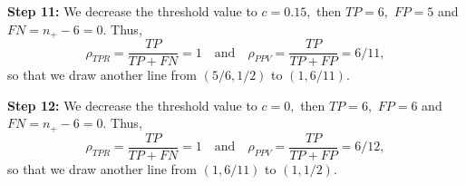 \documentclass[a4paper]{article}
\begin{document}
{\begin{minipage}{0.5\textwidth}
	\textbf{Step 11:}
We decrease the threshold value to $c=0.15,$ then $TP=6,$ $FP=5$ and $FN= n_+ - 6 = 0.$
%
Thus, 
%
%
$$  \rho_{TPR} = \frac{TP}{TP+FN} =  1 \quad \mbox{and} \quad \rho_{PPV} = \frac{TP}{TP + FP} =  6/11, $$
%
so that we draw another line from $(5/6,1/2)$ to $(1,6/11).$
%
\end{minipage}
\begin{minipage}{0.45\textwidth}
\centering
{}
\end{minipage}

\begin{minipage}{0.5\textwidth}
	\textbf{Step 12:}
We decrease the threshold value to $c=0,$ then $TP=6,$ $FP=6$ and $FN= n_+ - 6 = 0.$
%
Thus, 
%
%
$$  \rho_{TPR} = \frac{TP}{TP+FN} = 1 \quad \mbox{and} \quad \rho_{PPV} = \frac{TP}{TP + FP} =  6/12, $$
%
so that we draw another line from $(1,6/11)$ to $(1,1/2).$
%
\end{minipage}
\begin{minipage}{0.45\textwidth}
\centering
{}
\end{minipage}




}
\end{document}
